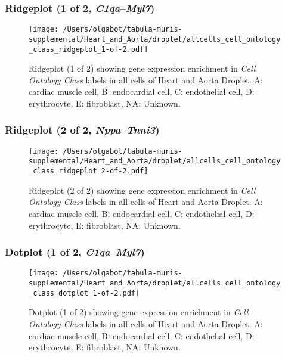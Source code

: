 \clearpage

\subsubsection{Ridgeplot (1 of 2, \emph{C1qa}--\emph{Myl7})}
\begin{figure}[h]
\centering
\texttt{[image: /Users/olgabot/tabula-muris-supplemental/Heart\_and\_Aorta/droplet/allcells\_cell\_ontology\_class\_ridgeplot\_1-of-2.pdf]}

\caption{ Ridgeplot (1 of 2)  showing gene expression enrichment in \emph{Cell Ontology Class} labels in all cells of Heart and Aorta Droplet. A: cardiac muscle cell, B: endocardial cell, C: endothelial cell, D: erythrocyte, E: fibroblast, NA: Unknown.}
\end{figure}


\clearpage

\subsubsection{Ridgeplot (2 of 2, \emph{Nppa}--\emph{Tnni3})}
\begin{figure}[h]
\centering
\texttt{[image: /Users/olgabot/tabula-muris-supplemental/Heart\_and\_Aorta/droplet/allcells\_cell\_ontology\_class\_ridgeplot\_2-of-2.pdf]}

\caption{ Ridgeplot (2 of 2)  showing gene expression enrichment in \emph{Cell Ontology Class} labels in all cells of Heart and Aorta Droplet. A: cardiac muscle cell, B: endocardial cell, C: endothelial cell, D: erythrocyte, E: fibroblast, NA: Unknown.}
\end{figure}


\clearpage

\subsubsection{Dotplot (1 of 2, \emph{C1qa}--\emph{Myl7})}
\begin{figure}[h]
\centering
\texttt{[image: /Users/olgabot/tabula-muris-supplemental/Heart\_and\_Aorta/droplet/allcells\_cell\_ontology\_class\_dotplot\_1-of-2.pdf]}

\caption{ Dotplot (1 of 2)  showing gene expression enrichment in \emph{Cell Ontology Class} labels in all cells of Heart and Aorta Droplet. A: cardiac muscle cell, B: endocardial cell, C: endothelial cell, D: erythrocyte, E: fibroblast, NA: Unknown.}
\end{figure}


